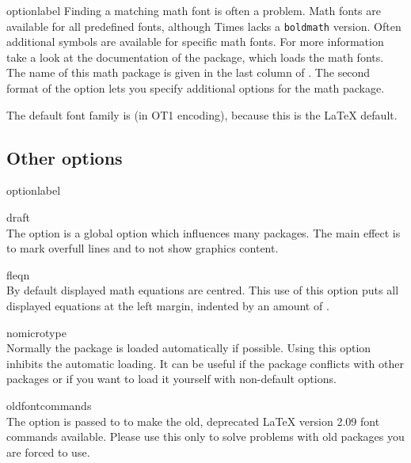\begin{labelled}{optionlabel}
  Finding a matching math font is often a problem. Math fonts are available
  for all predefined fonts, although Times lacks a \texttt{boldmath}
  version. Often additional symbols are available for specific math fonts.
  For more information take a look at the documentation of the package,
  which loads the math fonts. The name of this math package is given in the
  last column of . The second format of the 
  option lets you specify additional options  for the math
  package.

  The default font family is  (in \textsf{OT1} encoding), because
  this is the LaTeX default.
\end{labelled}


\subsection{Other options}
\begin{labelled}{optionlabel}
\item[draft]\\
  The  option is a global option which influences many packages.
  The main effect is to mark overfull lines and to not show graphics content.

\item[fleqn]\\
  By default displayed math equations are centred. This use of this option
  puts all displayed equations at the left margin, indented by an amount of
  .

\item[nomicrotype]\label{opt:nomicrotype}
  \\
  Normally the  package is loaded automatically if possible.
  Using this option inhibits the automatic loading. It can be useful if the
  package conflicts with other packages or if you want to load it yourself
  with non-default options.

\item[oldfontcommands]%
  \\
  The  option is passed to  to make the old,
  deprecated LaTeX version 2.09 font commands available. Please use this only
  to solve problems with old packages you are forced to use.
\end{labelled}

